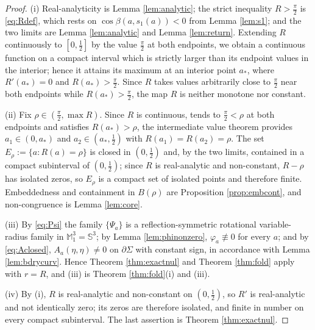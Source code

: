 \documentclass[10pt,a4paper]{amsart}
\newcommand{\M}{\mathbb{M}}
\newcommand{\Sph}{\mathbb{S}}
\begin{document}
\begin{proof}
(i) Real-analyticity is Lemma \ref{lem:analytic}; the strict inequality $R>\tfrac\pi2$ is \eqref{eq:Rdef}, which rests on $\cos\beta(a,s_1(a))<0$ from Lemma \ref{lem:s1}; and the two limits are Lemma \ref{lem:analytic} and Lemma \ref{lem:return}. Extending $R$ continuously to $[0,\tfrac12]$ by the value $\tfrac\pi2$ at both endpoints, we obtain a continuous function on a compact interval which is strictly larger than its endpoint values in the interior; hence it attains its maximum at an interior point $a_*$, where $R'(a_*)=0$ and $R(a_*)>\tfrac\pi2$. Since $R$ takes values arbitrarily close to $\tfrac\pi2$ near both endpoints while $R(a_*)>\tfrac\pi2$, the map $R$ is neither monotone nor constant.

(ii) Fix $\rho\in(\tfrac\pi2,\max R)$. Since $R$ is continuous, tends to $\tfrac\pi2<\rho$ at both endpoints and satisfies $R(a_*)>\rho$, the intermediate value theorem provides $a_1\in(0,a_*)$ and $a_2\in(a_*,\tfrac12)$ with $R(a_1)=R(a_2)=\rho$. The set $E_\rho:=\{a:R(a)=\rho\}$ is closed in $(0,\tfrac12)$ and, by the two limits, contained in a compact subinterval of $(0,\tfrac12)$; since $R$ is real-analytic and non-constant, $R-\rho$ has isolated zeros, so $E_\rho$ is a compact set of isolated points and therefore finite. Embeddedness and containment in $B(\rho)$ are Proposition \ref{prop:embcont}, and non-congruence is Lemma \ref{lem:core}.

(iii) By \eqref{eq:Psi} the family $\{\Psi_a\}$ is a reflection-symmetric rotational variable-radius family in $\M^3_1=\Sph^3$; by Lemma \ref{lem:phinonzero}, $\varphi_a\not\equiv 0$ for every $a$; and by \eqref{eq:Aclosed}, $A_a(\eta,\eta)\neq 0$ on $\partial\Sigma$ with constant sign, in accordance with Lemma \ref{lem:bdrycurv}. Hence Theorem \ref{thm:exactnul} and Theorem \ref{thm:fold} apply with $r=R$, and (iii) is Theorem \ref{thm:fold}(i) and (iii).

(iv) By (i), $R$ is real-analytic and non-constant on $(0,\tfrac12)$, so $R'$ is real-analytic and not identically zero; its zeros are therefore isolated, and finite in number on every compact subinterval. The last assertion is Theorem \ref{thm:exactnul}.
\end{proof}
\end{document}
